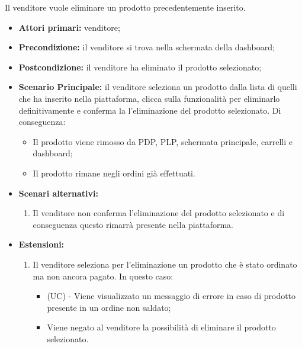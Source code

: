Il venditore vuole eliminare un prodotto precedentemente inserito.
\begin{itemize}
    \item \textbf{Attori primari:} venditore;
    \item \textbf{Precondizione:} il venditore si trova nella schermata della dashboard;
    \item \textbf{Postcondizione:} il venditore ha eliminato il prodotto selezionato;
    \item \textbf{Scenario Principale:} il venditore seleziona un prodotto dalla lista di quelli che ha inserito nella piattaforma, clicca sulla funzionalità per eliminarlo definitivamente e conferma la l'eliminazione del prodotto selezionato. Di conseguenza:
    \begin{itemize}
    	\item Il prodotto viene rimosso da PDP, PLP, schermata principale, carrelli e dashboard;
    	\item Il prodotto rimane negli ordini già effettuati.
    \end{itemize}
	\item \textbf{Scenari alternativi:}
	\begin{enumerate}[label=\lett]
		\item Il venditore non conferma l'eliminazione del prodotto selezionato e di conseguenza questo rimarrà presente nella piattaforma.
	\end{enumerate}
    \item \textbf{Estensioni:}
    \begin{enumerate}[label=\lett]
    	\item Il venditore seleziona per l'eliminazione un prodotto che è stato ordinato ma non ancora pagato. In questo caso:
    	\begin{itemize}
    		\item (UC) - Viene visualizzato un messaggio di errore in caso di prodotto presente in un ordine non saldato;
    		\item Viene negato al venditore la possibilità di eliminare il prodotto selezionato.
    	\end{itemize}
    \end{enumerate}
\end{itemize}

